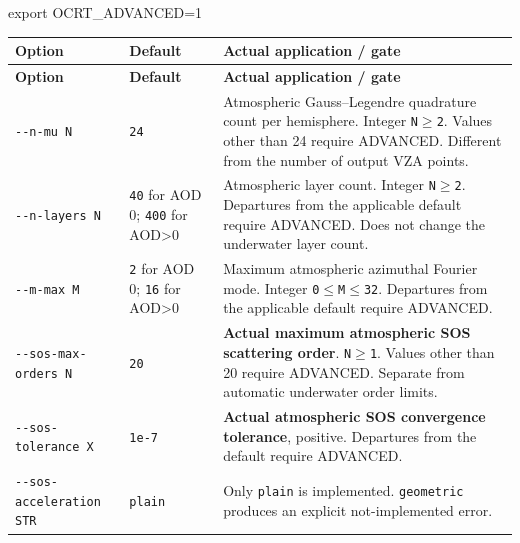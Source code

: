 

\begin{ManualCode}
export OCRT_ADVANCED=1
\end{ManualCode}


{\TableFont
\begin{longtable}{@{}>{\raggedright\arraybackslash}p{}>{\raggedright\arraybackslash}p{}>{\raggedright\arraybackslash}p{}@{}}
\toprule
\textbf{Option} & \textbf{Default} & \textbf{Actual application / gate} \\
\midrule
\endfirsthead
\toprule
\textbf{Option} & \textbf{Default} & \textbf{Actual application / gate} \\
\midrule
\endhead
\bottomrule
\endfoot
\texttt{-\allowbreak{}-\allowbreak{}n-\allowbreak{}mu N} & \texttt{24} & Atmospheric Gauss--Legendre quadrature count per hemisphere. Integer \texttt{N\ensuremath{\geq}2}. Values other than 24 require ADVANCED. Different from the number of output VZA points. \\
\texttt{-\allowbreak{}-\allowbreak{}n-\allowbreak{}layers N} & \texttt{40} for AOD 0; \texttt{400} for AOD>0 & Atmospheric layer count. Integer \texttt{N\ensuremath{\geq}2}. Departures from the applicable default require ADVANCED. Does not change the underwater layer count. \\
\texttt{-\allowbreak{}-\allowbreak{}m-\allowbreak{}max M} & \texttt{2} for AOD 0; \texttt{16} for AOD>0 & Maximum atmospheric azimuthal Fourier mode. Integer \texttt{0\ensuremath{\leq}M\ensuremath{\leq}32}. Departures from the applicable default require ADVANCED. \\
\texttt{-\allowbreak{}-\allowbreak{}sos-\allowbreak{}max-\allowbreak{}orders N} & \texttt{20} & \textbf{Actual maximum atmospheric SOS scattering order}. \texttt{N\ensuremath{\geq}1}. Values other than 20 require ADVANCED. Separate from automatic underwater order limits. \\
\texttt{-\allowbreak{}-\allowbreak{}sos-\allowbreak{}tolerance X} & \texttt{1e-\allowbreak{}7} & \textbf{Actual atmospheric SOS convergence tolerance}, positive. Departures from the default require ADVANCED. \\
\texttt{-\allowbreak{}-\allowbreak{}sos-\allowbreak{}acceleration STR\allowbreak{}} & \texttt{plain} & Only \texttt{plain} is implemented. \texttt{geometric} produces an explicit not-implemented error. \\

\end{longtable}}
